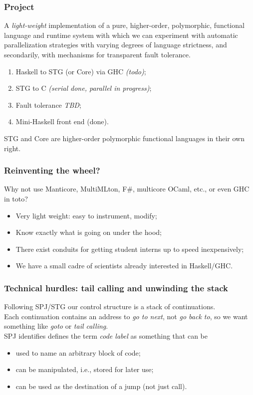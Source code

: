 \documentclass{beamer}
\begin{document}
\begin{frame}
\frametitle{Project} 
A \emph{light-weight} implementation of a pure, higher-order, polymorphic,
functional language and runtime system with which we can experiment with
automatic parallelization strategies with varying degrees of language
strictness, and secondarily, with mechanisms for transparent fault tolerance.
\begin{enumerate}
\item Haskell to STG (or Core) via GHC \emph{(todo)};
\item STG to C \emph{(serial done, parallel in progress)};
\item Fault tolerance \emph{TBD};
\item Mini-Haskell front end (done).
\end{enumerate}
STG and Core are higher-order polymorphic functional languages in their own right.
\end{frame}


\begin{frame}
\frametitle{Reinventing the wheel?}  Why not use Manticore, MultiMLton, F\#,
multicore OCaml, etc., or even GHC in toto?
\begin{itemize}
  \item Very light weight:  easy to instrument, modify;
  \item Know exactly what is going on under the hood;
  \item There exist conduits for getting student interns up to speed inexpensively;
  \item We have a small cadre of scientists already interested in Haskell/GHC.
\end{itemize}
\end{frame}


\begin{frame}
\frametitle{Technical hurdles:  tail calling and unwinding the stack}
Following SPJ/STG our control structure is a stack of continuations.  
\\\vspace{0.1in}
Each continuation contains an address to \emph{go to next}, not \emph{go back
  to}, so we want something like \emph{goto} or \emph{tail calling}.
\\\vspace{0.1in}
SPJ identifies defines the term \emph{code label} as something that can be
\begin{itemize}
  \item used to name an arbitrary block of code;
  \item can be manipulated, i.e., stored for later use;
  \item can be used as the destination of a jump (not just call).
\end{itemize}
\end{frame}
\end{document}
